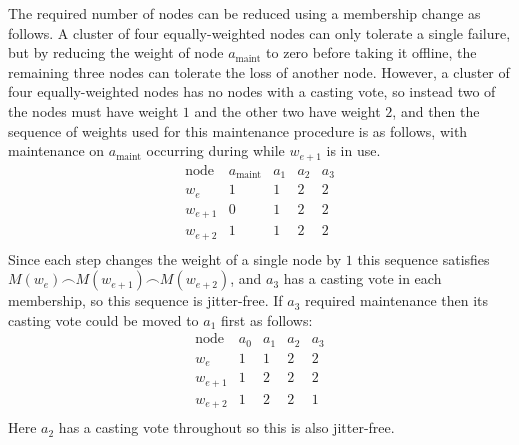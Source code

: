\documentclass[journal]{IEEEtran}
\begin{document}
The required number of nodes can be reduced using a membership change as
follows. A cluster of four equally-weighted nodes can only tolerate a single
failure, but by reducing the weight of node $a_{\textrm{maint}}$ to zero before
taking it offline, the remaining three nodes can tolerate the loss of another
node. However, a cluster of four equally-weighted nodes has no nodes with a
casting vote, so instead two of the nodes must have weight $1$ and the other
two have weight $2$, and then the sequence of weights used for this maintenance
procedure is as follows, with maintenance on $a_{\textrm{maint}}$ occurring
during while $w_{e+1}$ is in use.
\[\begin{array}{rcccc}
\textrm{node}&a_{\textrm{maint}}&a_1&a_2&a_3 \\
w_e&1&1&2&2\\
w_{e+1}&0&1&2&2\\
w_{e+2}&1&1&2&2\\
\end{array}\]
Since each step changes the weight of a single node by $1$ this sequence
satisfies $M(w_e) \frown M(w_{e+1}) \frown M(w_{e+2})$, and $a_3$ has a casting
vote in each membership, so this sequence is jitter-free.  If $a_3$ required
maintenance then its casting vote could be moved to $a_1$ first as follows:
\[\begin{array}{rcccc}
\textrm{node}&a_0&a_1&a_2&a_3 \\
w_e&1&1&2&2\\
w_{e+1}&1&2&2&2\\
w_{e+2}&1&2&2&1\\
\end{array}\]
Here $a_2$ has a casting vote throughout so this is also jitter-free.
\end{document}
